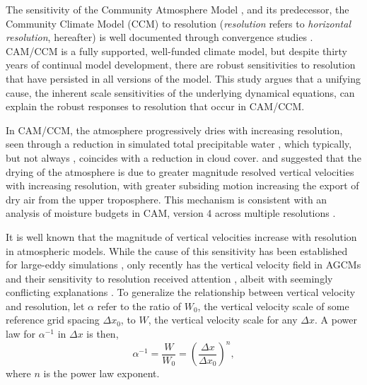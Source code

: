 \documentclass[times]{qjrms4}
\begin{document}
The sensitivity of the Community Atmosphere Model \citep[CAM;][]{CAM5}, and its predecessor, the Community Climate Model (CCM) to resolution ({\em{resolution}} refers to {\em{horizontal resolution}}, hereafter) is well documented through convergence studies \citep{KW1991JGR,WETAL1995CD,W2008TELLUS,RETAL2013JCLIM,ZetAl2014JCb,HR2017JCLIM}. CAM/CCM is a fully supported, well-funded climate model, but despite thirty years of continual model development, there are robust sensitivities to resolution that have persisted in all versions of the model. This study argues that a unifying cause, the inherent scale sensitivities of the underlying dynamical equations, can explain the robust responses to resolution that occur in CAM/CCM.

In CAM/CCM, the atmosphere progressively dries with increasing resolution, seen through a reduction in simulated total precipitable water \citep{KW1991JGR,WETAL1995CD,W2008TELLUS,RETAL2013JCLIM,ZetAl2014JCb,HR2017JCLIM}, which typically, but not always \citep[see][]{WETAL1995CD,ZetAl2014JCb}, coincides with a reduction in cloud cover. \cite{KW1991JGR} and \cite{WETAL1995CD} suggested that the drying of the atmosphere is due to greater magnitude resolved vertical velocities with increasing resolution, with greater subsiding motion increasing the export of dry air from the upper troposphere. This mechanism is consistent with an analysis of moisture budgets in CAM, version 4 \citep[CAM4;][]{CAM4} across multiple resolutions \citep{YETAL2014JCLIM,HR2017JCLIM}.

It is well known that the magnitude of vertical velocities increase with resolution in atmospheric models. While the cause of this sensitivity has been established for large-eddy simulations \citep[see][and references therein]{J2017JAMES}, only recently has the vertical velocity field in AGCMs and their sensitivity to resolution received attention \citep{DETALA2016ACP,OETAL2016JAMES}, albeit with seemingly conflicting explanations \citep{RETAL2016CD,HR2018JAMES}. To generalize the relationship between vertical velocity and resolution, let $\alpha$ refer to the ratio of $W_0$, the vertical velocity scale of some reference grid spacing $\Delta x_0$, to $W$, the vertical velocity scale for any $\Delta x$. A power law for $\alpha^{-1}$ in $\Delta x$ is then,
\begin{equation}
\alpha^{-1} = \frac{W}{W_0} = \left( \frac{\Delta x}{\Delta x_0} \right)^n, \label{eq:alpha}
\end{equation}
where $n$ is the power law exponent. 
\end{document}

